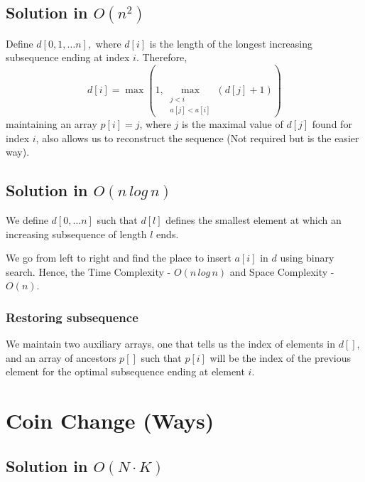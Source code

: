 \documentclass{article}
\begin{document}
	\subsection{Solution in $O(n^2)$}
	Define $d[0,1, \ldots n],$ where $d[i]$ is the length of the longest increasing subsequence ending at index $i$. Therefore,
	\[
	d[i] = \max \left(1,
	\underset{\substack{
			j < i \\
			a[j] < a[i]
	}}{\max} (d[j] + 1) \right)
	\]
	maintaining an array $p[i] = j$, where $j$ is the maximal value of $d[j]$ found for index $i$, also allows us to reconstruct the sequence (Not required but is the easier way).
	
	\subsection{Solution in $O(n \, log \, n)$}
	We define $d[0, \dots n]$ such that $d[l]$ defines the smallest element at which an increasing subsequence of length $l$ ends. \newline
	
	We go from left to right and find the place to insert $a[i]$ in $d$ using binary search. Hence, the Time Complexity - $O(n \, log \, n)$ and Space Complexity - $O(n)$.
	
	\subsubsection{Restoring subsequence}
	We maintain two auxiliary arrays, one that tells us the index of elements in $d[]$, and an array of ancestors $p[]$ such that $p[i]$ will be the index of the previous element for the optimal subsequence ending at element $i$.
	
	\section{Coin Change (Ways)}
	\begin{algorithm}[H]
		\SetAlgoLined
		\caption{Problem: Coin Change (Ways)}
	\end{algorithm}
	\vspace{5mm}
	
	\subsection{Solution in $O(N \cdot K)$}
	
\end{document}
